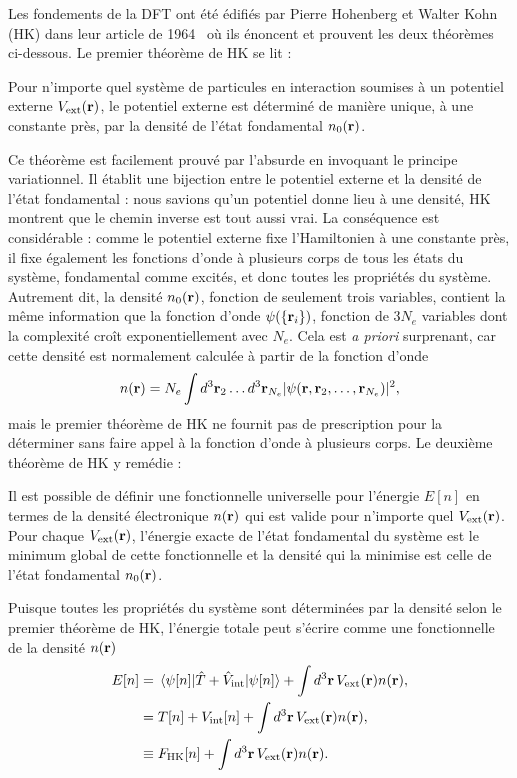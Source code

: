 Les fondements de la DFT ont été édifiés par Pierre Hohenberg et Walter Kohn (HK) dans leur article de 1964~\cite{hohenbergInhomogeneousElectronGas1964} où ils énoncent et prouvent les deux théorèmes ci-dessous. Le premier théorème de HK se lit :
\begin{theo}
    \label{thm:hk1}
    Pour n'importe quel système de particules en interaction soumises à un potentiel externe $V_\text{ext}(\mathbf{r})$, le potentiel externe est déterminé de manière unique, à une constante près, par la densité de l'état fondamental $n_0(\mathbf{r})$.
\end{theo}
\noindent
Ce théorème est facilement prouvé par l'absurde en invoquant le principe variationnel. Il établit une bijection entre le potentiel externe et la densité de l'état fondamental : nous savions qu'un potentiel donne lieu à une densité, HK montrent que le chemin inverse est tout aussi vrai. La conséquence est considérable : comme le potentiel externe fixe l'Hamiltonien à une constante près, il fixe également les fonctions d'onde à plusieurs corps de tous les états du système, fondamental comme excités, et donc toutes les propriétés du système. Autrement dit, la densité $n_0(\mathbf{r})$, fonction de seulement trois variables, contient la même information que la fonction d'onde $\psi(\{\mathbf{r}_i\})$, fonction de $3N_e$ variables dont la complexité croît exponentiellement avec $N_e$. Cela est \textit{a priori} surprenant, car cette densité est normalement calculée à partir de la fonction d'onde
\begin{equation}
    n(\mathbf{r})=N_e\int d^3\mathbf{r}_2\dots d^3\mathbf{r}_{N_e}|\psi(\mathbf{r},\mathbf{r}_2,\dots,\mathbf{r}_{N_e})|^2,
\end{equation}
mais le premier théorème de HK ne fournit pas de prescription pour la déterminer sans faire appel à la fonction d'onde à plusieurs corps. Le deuxième théorème de HK y remédie :
\begin{theo}
    \label{thm:hk2}
    Il est possible de définir une fonctionnelle universelle pour l'énergie $E[n]$ en termes de la densité électronique $n(\mathbf{r})$ qui est valide pour n'importe quel $V_\text{ext}(\mathbf{r})$. Pour chaque $V_\text{ext}(\mathbf{r})$, l'énergie exacte de l'état fondamental du système est le minimum global de cette fonctionnelle et la densité qui la minimise est celle de l'état fondamental $n_0(\mathbf{r})$.
\end{theo}
\noindent
Puisque toutes les propriétés du système sont déterminées par la densité selon le premier théorème de HK, l'énergie totale peut s'écrire comme une fonctionnelle de la densité $n(\mathbf{r})$
\begin{align}
    E[n]&=\matrixel{\psi[n]}{\hat{T}+\hat{V}_\text{int}}{\psi[n]}+\int d^3\rv\,V_\text{ext}(\rv)n(\rv),\notag\\
    &= T[n]+V_\text{int}[n]+\int d^3\rv\,V_\text{ext}(\rv)n(\rv),\notag\\
    &\equiv F_\text{HK}[n]+\int d^3\rv\,V_\text{ext}(\rv)n(\rv).
\end{align}
